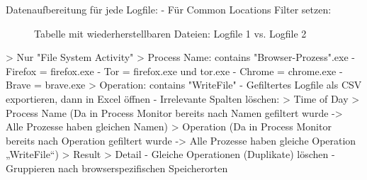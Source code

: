 Datenaufbereitung für jede Logfile:
- Für Common Locations Filter setzen: 
	\begin{figure}[h!]
		\caption{Tabelle mit wiederherstellbaren Dateien: Logfile 1 vs. Logfile 2}
	\end{figure}
	> Nur "File System Activity"
	> Process Name: contains "Browser-Prozess".exe
		- Firefox = firefox.exe
		- Tor = firefox.exe und tor.exe
		- Chrome = chrome.exe
		- Brave = brave.exe
	> Operation: contains "WriteFile"
- Gefiltertes Logfile als CSV exportieren, dann in Excel öffnen
- Irrelevante Spalten löschen: 
	> Time of Day
	> Process Name (Da in Process Monitor bereits nach Namen gefiltert wurde -> Alle Prozesse haben gleichen Namen)
	> Operation (Da in Process Monitor bereits nach Operation gefiltert wurde -> Alle Prozesse haben gleiche Operation „WriteFile“)
	> Result
	> Detail
- Gleiche Operationen (Duplikate) löschen
- Gruppieren nach browserspezifischen Speicherorten


